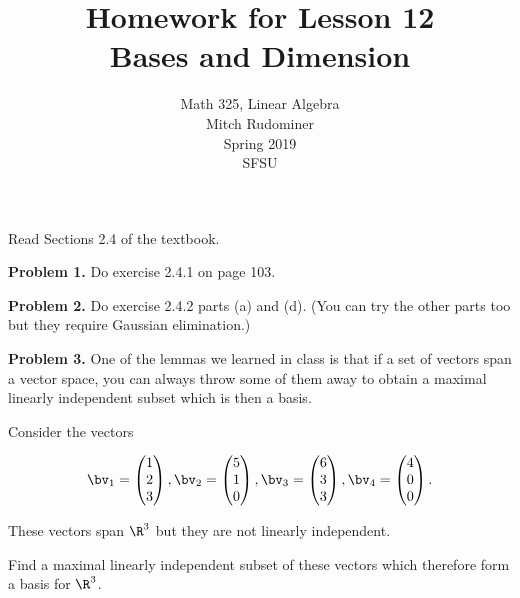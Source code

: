 \documentclass[oneside,12pt]{amsart}
\begin{document}
\title{Homework for Lesson 12 \\ Bases and Dimension}
\author{Math 325, Linear Algebra \\ Mitch Rudominer \\ Spring 2019 \\ SFSU }
\date{}

\maketitle

Read Sections 2.4 of the textbook.

\bigskip

\textbf{Problem 1.} Do exercise 2.4.1 on page 103.

\bigskip
\bigskip
\bigskip
\bigskip
\bigskip
\bigskip

\textbf{Problem 2.} Do exercise 2.4.2 parts (a) and (d). (You can
try the other parts too but they require Gaussian elimination.)

\bigskip
\bigskip
\bigskip
\bigskip
\bigskip
\bigskip


\textbf{Problem 3.} One of the lemmas we learned in class is that if a set
of vectors span a vector space, you can always throw some of them away to
obtain a maximal linearly independent subset which is then a basis.

Consider the vectors

$$
\bv_1 =
\begin{pmatrix}
1 \\ 2 \\3
\end{pmatrix},
\bv_2 =
\begin{pmatrix}
5 \\ 1 \\ 0
\end{pmatrix},
\bv_3 =
\begin{pmatrix}
6 \\ 3 \\ 3
\end{pmatrix},
\bv_4 =
\begin{pmatrix}
4 \\ 0 \\ 0
\end{pmatrix}.
$$

These vectors span $\R^3$ but they are not linearly independent.

Find a maximal linearly independent subset of these vectors which therefore
form a basis for $\R^3$.

\newpage
\end{document}
